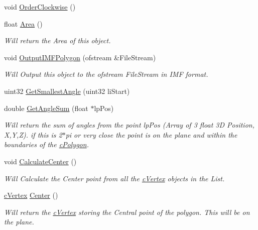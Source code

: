 \begin{DoxyCompactItemize}
void \hyperlink{classc_polygon_ac9992796dcbe51dbf26e4ffddaa57514}{OrderClockwise} ()
\item 
float \hyperlink{classc_polygon_a4ef25bebffda1b61ea7f373432d9de4c}{Area} ()
\begin{DoxyCompactList}\small\item\em Will return the Area of this object. \item\end{DoxyCompactList}\item 
void \hyperlink{classc_polygon_a7670adccfeb0f099d6d2dd87f44ed68a}{OutputIMFPolygon} (ofstream \&FileStream)
\begin{DoxyCompactList}\small\item\em Will Output this object to the ofstream FileStream in IMF format. \item\end{DoxyCompactList}\item 
uint32 \hyperlink{classc_polygon_ad35523f4fecebb667516825697497b21}{GetSmallestAngle} (uint32 liStart)
\item 
double \hyperlink{classc_polygon_aa0ca7310cd7a5e4928545b0f4848dc76}{GetAngleSum} (float $\ast$lpPos)
\begin{DoxyCompactList}\small\item\em Will return the sum of angles from the point lpPos (Array of 3 float 3D Position, X,Y,Z). if this is 2$\ast$pi or very close the point is on the plane and within the boundaries of the \hyperlink{classc_polygon}{cPolygon}. \item\end{DoxyCompactList}\item 
void \hyperlink{classc_polygon_a68b5ed2b38f57344d31dcbd0fe99d8c7}{CalculateCenter} ()
\begin{DoxyCompactList}\small\item\em Will Calculate the Center point from all the \hyperlink{classc_vertex}{cVertex} objects in the List. \item\end{DoxyCompactList}\item 
\hyperlink{classc_vertex}{cVertex} \hyperlink{classc_polygon_a44133af3a1fd4779487b4703494da7e9}{Center} ()
\begin{DoxyCompactList}\small\item\em Will return the \hyperlink{classc_vertex}{cVertex} storing the Central point of the polygon. This will be on the plane. \item\end{DoxyCompactList}\item 

\end{DoxyCompactItemize}
